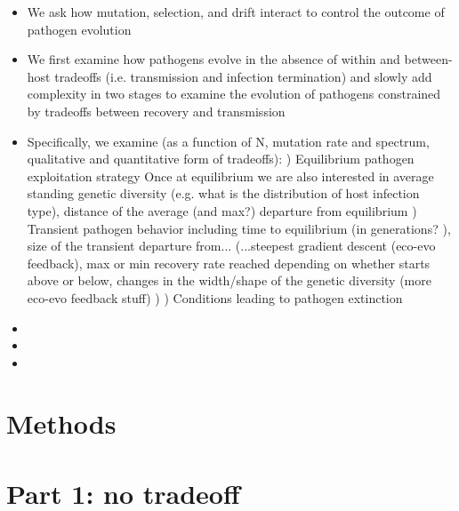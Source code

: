 \begin{itemize}
    \item We ask how mutation, selection, and drift interact to control the outcome of pathogen evolution
    \item We first examine how pathogens evolve in the absence of within and between-host tradeoffs (i.e. transmission and infection termination) and slowly add complexity in two stages to examine the evolution of pathogens constrained by tradeoffs between recovery and transmission
    \item Specifically, we examine (as a function of N, mutation rate and spectrum, qualitative and quantitative form of tradeoffs):
        ) Equilibrium pathogen exploitation strategy
            \subsubitem Once at equilibrium we are also interested in average standing genetic diversity (e.g. what is the distribution of host infection type), distance of the average (and max?) departure from equilibrium
        ) Transient pathogen behavior 
            \subsubitem including time to equilibrium (in generations? ), size of the transient departure from... (...steepest gradient descent (eco-evo feedback), max or min recovery rate reached depending on whether starts above or below, changes in the width/shape of the genetic diversity (more eco-evo feedback stuff) )
        ) Conditions leading to pathogen extinction
    \item {}
    \item {}
    \item {}
    
        
\end{itemize}

\section*{Methods}

\section*{Part 1: no tradeoff}

